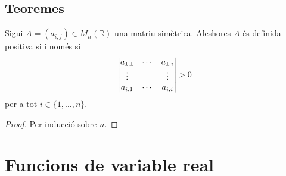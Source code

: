 \documentclass[../Apunts.tex]{subfiles}
\begin{document}
	\subsection{Teoremes}
	\begin{theorem}
		Sigui \(A=(a_{i,j})\in M_{n}(\mathbb{R})\) una matriu simètrica. Aleshores \(A\) és definida positiva si i només si
		\[\abs{\begin{matrix}
		a_{1,1}&\cdots&a_{1,i}\\
		\vdots&&\vdots\\
		a_{i,1}&\cdots&a_{i,i}\\
		\end{matrix}}>0\]
		per a tot \(i\in\{1,\dots,n\}\).
		\begin{proof}
			Per inducció sobre \(n\).
		\end{proof}
	\end{theorem}
	\section{Funcions de variable real}
\end{document}
